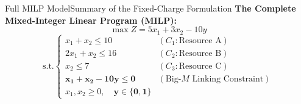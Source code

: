 \documentclass[aspectratio=169]{beamer}
\begin{document}
\begin{frame}{Full MILP Model}{Summary of the Fixed-Charge Formulation}
\textbf{The Complete Mixed-Integer Linear Program (MILP):}
    \[ \max Z = 5x_1 + 3x_2 - 10y \]
    \[ \text{s.t.} \begin{cases}
        x_1 + x_2 \le 10 & (C_1: \text{Resource A}) \\
        2x_1 + x_2 \le 16 & (C_2: \text{Resource B}) \\
        x_2 \le 7 & (C_3: \text{Resource C}) \\
        \mathbf{x_1 + x_2 - 10y \le 0} & (\text{Big-}M \text{ Linking Constraint}) \\
        x_1, x_2 \ge 0, \quad \mathbf{y \in \{0, 1\}}
    \end{cases} \]
\end{frame}
\end{document}

